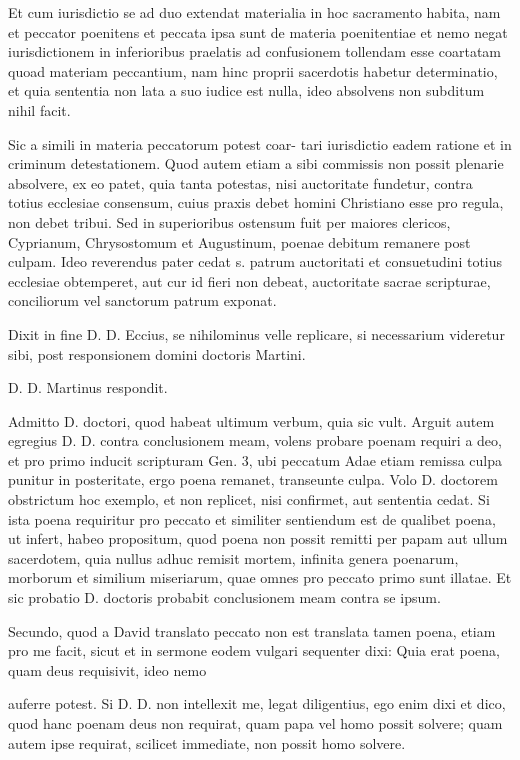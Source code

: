 Et cum iurisdictio se ad duo extendat materialia in hoc sacramento habita, nam et peccator poenitens et peccata ipsa sunt de materia poenitentiae et nemo negat iurisdictionem in inferioribus praelatis ad confusionem tollendam esse coartatam quoad materiam peccantium, nam hinc proprii sacerdotis habetur determinatio, et quia sententia non lata a suo iudice est nulla, ideo absolvens non subditum nihil facit.

Sic a simili in materia peccatorum potest coar- \marginpar{\small[376]} tari iurisdictio eadem ratione et in criminum detestationem. Quod autem etiam a sibi commissis non possit plenarie absolvere, ex eo patet, quia tanta potestas, nisi auctoritate fundetur, contra totius ecclesiae consensum, cuius praxis debet homini Christiano esse pro regula, non debet tribui. Sed in superioribus ostensum fuit per maiores clericos, Cyprianum, Chrysostomum et Augustinum, poenae debitum remanere post culpam. Ideo reverendus pater cedat s. patrum auctoritati et consuetudini totius ecclesiae obtemperet, aut cur id fieri non debeat, auctoritate sacrae scripturae, conciliorum vel sanctorum patrum exponat.

Dixit in fine D. D. Eccius, se nihilominus velle replicare, si necessarium videretur sibi, post responsionem domini doctoris Martini.

D. D. Martinus respondit.

Admitto D. doctori, quod habeat ultimum verbum, quia sic vult. Arguit autem egregius D. D. contra conclusionem meam, volens probare poenam requiri a deo, et pro primo inducit scripturam Gen. 3, ubi peccatum Adae etiam remissa culpa punitur in posteritate, ergo poena remanet, transeunte culpa. Volo D. doctorem obstrictum hoc exemplo, et non replicet, nisi confirmet, aut sententia cedat. Si ista poena requiritur pro peccato et similiter sentiendum est de qualibet poena, ut infert, habeo propositum, quod poena non possit remitti per papam aut ullum sacerdotem, quia nullus adhuc remisit mortem, infinita genera poenarum, morborum et similium miseriarum, quae omnes pro peccato primo sunt illatae. Et sic probatio D. doctoris probabit conclusionem meam contra se ipsum.

Secundo, quod a David translato peccato non est translata tamen poena, etiam pro me facit, sicut et in sermone eodem vulgari sequenter dixi: Quia erat poena, quam deus requisivit, ideo nemo

auferre potest. Si D. D. non intellexit me, legat diligentius, ego enim dixi et dico, quod hanc poenam deus non requirat, quam papa vel homo possit solvere; quam autem ipse requirat, scilicet immediate, non possit homo solvere.

